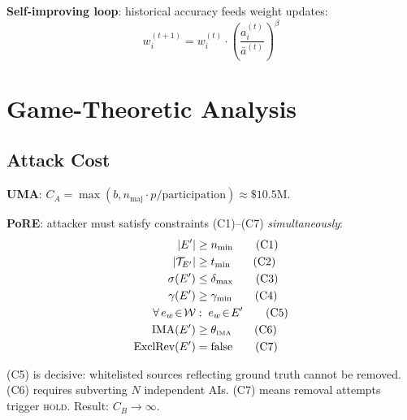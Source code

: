 \documentclass[11pt,a4paper,twocolumn]{article}
\begin{document}
\textbf{Self-improving loop}: historical accuracy feeds weight updates:
\begin{equation}
    w_i^{(t+1)} = w_i^{(t)} \cdot \left(\frac{a_i^{(t)}}{\bar{a}^{(t)}}\right)^\beta
    \label{eq:weight}
\end{equation}

\section{Game-Theoretic Analysis}

\subsection{Attack Cost}

\textbf{UMA}: $C_A = \max(b, n_{\text{maj}} \cdot p / \text{participation}) \approx \$10.5$M.

\textbf{PoRE}: attacker must satisfy constraints (C1)--(C7) \emph{simultaneously}:
\begin{align}
    |E'| &\geq n_{\min} \tag{C1} \\
    |\mathcal{T}_{E'}| &\geq t_{\min} \tag{C2} \\
    \sigma(E') &\leq \delta_{\max} \tag{C3} \\
    \gamma(E') &\geq \gamma_{\min} \tag{C4} \\
    \forall\, e_w \!\in\! \mathcal{W}&:\; e_w \!\in\! E' \tag{C5} \\
    \text{IMA}(E') &\geq \theta_{\text{\tiny IMA}} \tag{C6} \\
    \text{ExclRev}(E') &= \text{false} \tag{C7}
\end{align}

(C5) is decisive: whitelisted sources reflecting ground truth cannot be removed. (C6) requires subverting $N$ independent AIs. (C7) means removal attempts trigger \textsc{hold}. Result: $C_B \to \infty$.
\end{document}
